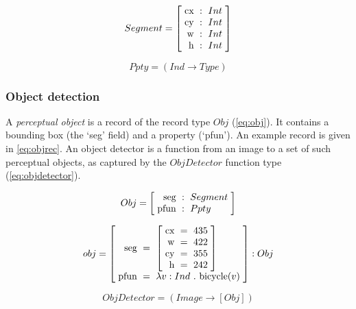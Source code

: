 \begin{equation}\label{eq:seg}
Segment = \rec{
\text{cx} &:& Int\\
\text{cy} &:& Int\\
\text{w} &:& Int\\
\text{h} &:& Int
}\end{equation}

\begin{equation}\label{eq:ppty}
Ppty = (Ind \rightarrow Type)\end{equation}




\subsubsection{Object detection}

A \textit{perceptual object} is a record of the record type $Obj$ (\autoref{eq:obj}).
It contains a bounding box (the `seg' field) and a property (`pfun').
An example record is given in \autoref{eq:objrec}.
An object detector is a function from an image to a set of such perceptual objects, as captured by the $ObjDetector$ function type (\autoref{eq:objdetector}).


\begin{equation}\label{eq:obj}
Obj = \rec{
\text{seg} &:& Segment\\
\text{pfun} &:& Ppty \\
}\end{equation}

\begin{equation}\label{eq:objrec}
obj =
\rec{
\text{seg} &=& \rec{
\text{cx} &=& 435\\
\text{w} &=& 422\\
\text{cy} &=& 355\\
\text{h} &=& 242
}\\
\text{pfun} &=& \lambda v:Ind\ .\ \text{bicycle}(v)\\
} : Obj\end{equation}

\begin{equation}\label{eq:objdetector}
ObjDetector = ( Image \rightarrow [Obj] )
\end{equation}




